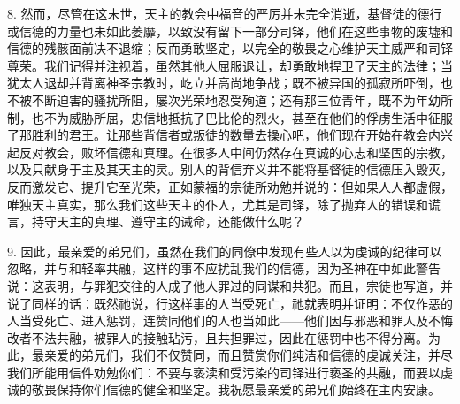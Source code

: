 8. 然而，尽管在这末世，天主的教会中福音的严厉并未完全消逝，基督徒的德行或信德的力量也未如此萎靡，以致没有留下一部分司铎，他们在这些事物的废墟和信德的残骸面前决不退缩；反而勇敢坚定，以完全的敬畏之心维护天主威严和司铎尊荣。我们记得并注视着，虽然其他人屈服退让，却勇敢地捍卫了天主的法律；当犹太人退却并背离神圣宗教时，屹立并高尚地争战；既不被异国的孤寂所吓倒，也不被不断迫害的骚扰所阻，屡次光荣地忍受殉道；还有那三位青年，既不为年幼所制，也不为威胁所屈，忠信地抵抗了巴比伦的烈火，甚至在他们的俘虏生活中征服了那胜利的君王。让那些背信者或叛徒的数量去操心吧，他们现在开始在教会内兴起反对教会，败坏信德和真理。在很多人中间仍然存在真诚的心志和坚固的宗教，以及只献身于主及其天主的灵。别人的背信弃义并不能将基督徒的信德压入毁灭，反而激发它、提升它至光荣，正如蒙福的宗徒所劝勉并说的：但如果人人都虚假，唯独天主真实，那么我们这些天主的仆人，尤其是司铎，除了抛弃人的错误和谎言，持守天主的真理、遵守主的诫命，还能做什么呢？\par

9. 因此，最亲爱的弟兄们，虽然在我们的同僚中发现有些人以为虔诚的纪律可以忽略，并与和轻率共融，这样的事不应扰乱我们的信德，因为圣神在中如此警告说：这表明，与罪犯交往的人成了他人罪过的同谋和共犯。而且，宗徒也写道，并说了同样的话：既然祂说，行这样事的人当受死亡，祂就表明并证明：不仅作恶的人当受死亡、进入惩罚，连赞同他们的人也当如此——他们因与邪恶和罪人及不悔改者不法共融，被罪人的接触玷污，且共担罪过，因此在惩罚中也不得分离。为此，最亲爱的弟兄们，我们不仅赞同，而且赞赏你们纯洁和信德的虔诚关注，并尽我们所能用信件劝勉你们：不要与亵渎和受污染的司铎进行亵圣的共融，而要以虔诚的敬畏保持你们信德的健全和坚定。我祝愿最亲爱的弟兄们始终在主内安康。\par



